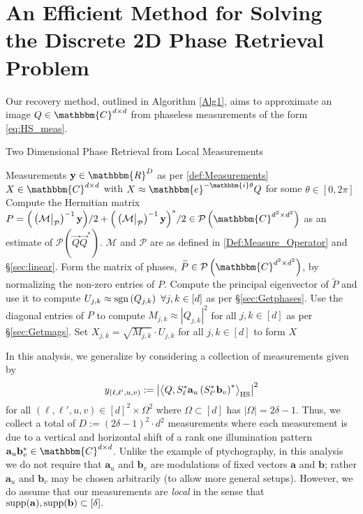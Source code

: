 \documentclass[]{spie}  %
\def \vec{\overrightarrow}
\def \a {\mathbf a}
\def \b {\mathbf b}
\def \x {\mathbf x}
\def \y {\mathbf y}
\def \C {\mathbbm{C}}
\def \HS {\rm HS}
\def \sgn {{\rm sgn}}
\def \supp {{\rm supp}}
\begin{document}
\section{An Efficient Method for Solving the Discrete 2D Phase Retrieval Problem}
\label{sec:TheMethod}
Our recovery method, outlined in Algorithm \ref{Alg1}, aims to approximate an image $Q\in \C^{d\times d}$ from phaseless measurements of the form \eqref{eq:HS_meas}.    
%
%
\begin{algorithm}[b!]
\renewcommand{\algorithmicrequire}{\textbf{Input:}}
\renewcommand{\algorithmicensure}{\textbf{Output:}}
\caption{Two Dimensional Phase Retrieval from Local Measurements}
\label{Alg1}
\begin{algorithmic}[1]
    \REQUIRE Measurements $\y\in \mathbbm{R}^D$ as per \eqref{def:Measurements}
    \ENSURE $X \in \mathbbm{C}^{d \times d}$ with $X \approx \mathbbm{e}^{-\mathbbm{i} \theta} Q$ for some $\theta \in [0, 2 \pi]$ 
    \STATE Compute the Hermitian matrix $P = \Big( \left(\mathcal{M} \big|_{\mathcal{P}}\right)^{-1} {\bf y}\Big)/2 + \Big( \left(\mathcal{M} \big|_{\mathcal{P}}\right)^{-1} {\bf y}\Big)^*/2  \in \mathcal{P}\left(\mathbbm{C}^{d^2\times d^2}\right)$ as an estimate of $\mathcal{P} \left( \vec{Q} \vec{Q}^* \right)$.  $\mathcal{M}$ and $\mathcal{P}$ are as defined in \eqref{Def:Measure_Operator} and \S\ref{sec:linear}.
    \STATE Form the matrix of phases, $\widetilde{P} \in \mathcal{P}\left(\mathbbm{C}^{d^2\times d^2}\right)$, by normalizing the non-zero entries of $P$.
    \STATE Compute the principal eigenvector of $\widetilde{P}$ and use it to compute $U_{j,k} \approx \sgn\left( Q_{j,k}\right) ~\forall j,k \in [d]$ as per \S\ref{sec:Getphases}.
    \STATE Use the diagonal entries of $P$ to compute $M_{j,k} \approx \left| Q_{j,k} \right|^2$ for all $j,k \in [d]$ as per \S\ref{sec:Getmags}.
    \STATE Set $X_{j,k} = \sqrt{M_{j,k}} \cdot U_{j,k}$ for all $j,k \in [d]$ to form $X$
    \end{algorithmic}
\end{algorithm}
%
%
%
In this analysis, we generalize by considering a collection of measurements given by 
\begin{equation}
y_{(\ell,\ell',u,v)} := \left| \left\langle Q, S^*_{\ell} \a_u \left(S^*_{\ell'} \b_v \right)^* \right\rangle_{\HS} \right|^2
\label{def:Measurements}
\end{equation}
for all $(\ell,\ell',u,v) \in [d]^2 \times\Omega^2$ where $\Omega \subset [d]$ has $|\Omega| = 2\delta-1$.  Thus, we collect a total of $D := (2\delta-1)^2 \cdot d^2 $ measurements where each measurement is due to a vertical and horizontal shift of a rank one illumination pattern $\a_u \b_v^* \in \mathbbm{C}^{d \times d}$.  Unlike the example of ptychography, in this analysis we do not require that $\a_u$ and $\b_v$ are modulations of fixed vectors $\a$ and $\b$; rather $\a_u$ and $\b_v$ may be chosen arbitrarily (to allow more general setups).  However, we do assume that our measurements are \emph{local} in the sense that $\supp(\a), \supp(\b) \subset [\delta].$ %
\end{document}
